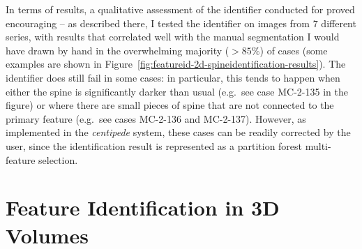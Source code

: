 In terms of results, a qualitative assessment of the identifier conducted for \cite{gvcispa09} proved encouraging -- as described there, I tested the identifier on images from $7$ different series, with results that correlated well with the manual segmentation I would have drawn by hand in the overwhelming majority ($> 85\%$) of cases (some examples are shown in Figure~\ref{fig:featureid-2d-spineidentification-results}). The identifier does still fail in some cases: in particular, this tends to happen when either the spine is significantly darker than usual (e.g.~see case MC-2-135 in the figure) or where there are small pieces of spine that are not connected to the primary feature (e.g.~see cases MC-2-136 and MC-2-137). However, as implemented in the \emph{centipede} system, these cases can be readily corrected by the user, since the identification result is represented as a partition forest multi-feature selection.


\begin{landscape}
\end{landscape}


\afterpage{\clearpage}
\newpage

\section{Feature Identification in 3D Volumes}

